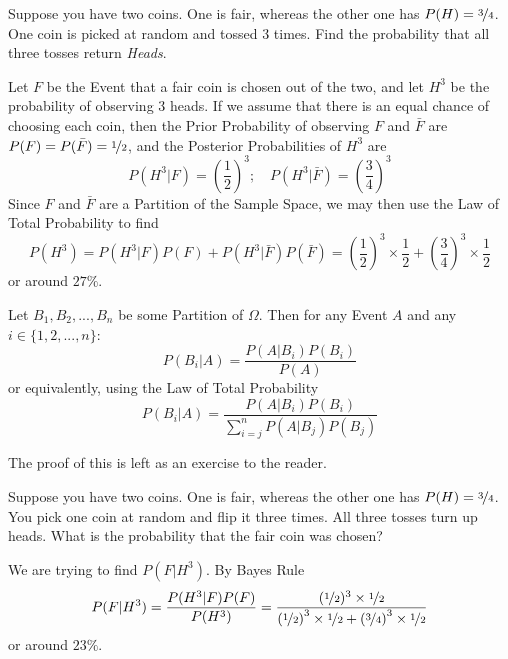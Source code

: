 \documentclass{report}
\begin{document}
\begin{example}
    Suppose you have two coins. One is fair, whereas the other one has $P(H)=\nicefrac 34$. One coin is picked at random and tossed 3 times. Find the probability that all three tosses return \emph{Heads}.

    \solution
    Let $F$ be the Event that a fair coin is chosen out of the two, and let $H^3$ be the probability of observing 3 heads. If we assume that there is an equal chance of choosing each coin, then the Prior Probability of observing $F$ and $\bar F$ are $P(F)=P(\bar F)=\nicefrac 12$, and the Posterior Probabilities of $H^3$ are
    \[
        P(H^3 | F) = \left(\frac 12\right)^3;\quad P(H^3 | \bar F) = \left(\frac 34\right)^3
    \]
    Since $F$ and $\bar F$ are a Partition of the Sample Space, we may then use the Law of Total Probability to find
    \[
        P(H^3) = P(H^3|F)P(F)+P(H^3|\bar F)P(\bar F)= \left(\frac 12\right)^3\times \frac 12 + \left(\frac 34\right)^3\times\frac 12
    \]
    or around $27\%$.
\end{example}
    

\begin{theorem}
    Let $B_1,B_2,...,B_n$ be some Partition of $\Omega$. Then for any Event $A$ and any $i\in \{1,2,...,n\}$:
    \[
        P(B_i\vert A) = \frac{P(A\vert B_i)P(B_i)}{P(A)}
    \]
    or equivalently, using the Law of Total Probability
    \[
        P(B_i\vert A) = \frac{P(A\vert B_i)P(B_i)}{\sum_{i=j}^n P(A|B_j)P(B_j)}
    \]
    
    The proof of this is left as an exercise to the reader. 
\end{theorem}

\begin{example}
    Suppose you have two coins. One is fair, whereas the other one has $P(H)=\nicefrac 34$. You pick one coin at random and flip it three times. All three tosses turn up heads. What is the probability that the fair coin was chosen?

    We are trying to find $P(F|H^3)$. By Bayes Rule
    \[
        P(F | H^3) = \frac {P(H^3| F)P(F)}{P(H^3)} = \frac{(\nicefrac 12)^3\times \nicefrac 12}{\left(\nicefrac 12\right)^3\times \nicefrac 12 + \left(\nicefrac 34\right)^3\times\nicefrac 12}
    \]
    or around $23\%$.
\end{example}
\end{document}
